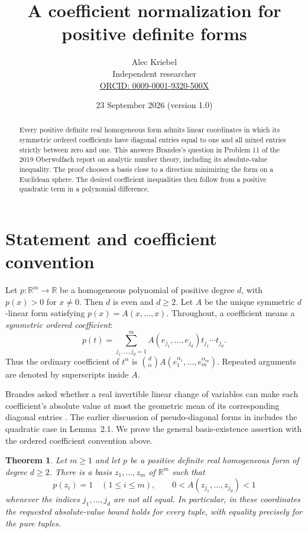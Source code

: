 \documentclass[11pt]{article}
\title{A coefficient normalization for positive definite forms}
\author{Alec Kriebel\\[3pt]\small Independent researcher\\
\small\href{https://orcid.org/0009-0001-9320-500X}{ORCID: 0009-0001-9320-500X}}
\date{23 September 2026 \quad (version 1.0)}
\newtheorem{theorem}{Theorem}
\newcommand{\R}{\mathbb R}
\begin{document}
\maketitle
\begin{abstract}
Every positive definite real homogeneous form admits linear coordinates in
which its symmetric ordered coefficients have diagonal entries equal to one
and all mixed entries strictly between zero and one. This answers Brandes's
question in Problem 11 of the 2019 Oberwolfach report on analytic number
theory, including its absolute-value inequality. The proof chooses a basis
close to a direction minimizing the form on a Euclidean sphere. The desired
coefficient inequalities then follow from a positive quadratic term in a
polynomial difference.
\end{abstract}

\section{Statement and coefficient convention}
Let $p\colon\R^m\to\R$ be a homogeneous polynomial of positive degree $d$, with
$p(x)>0$ for $x\ne0$. Then $d$ is even and $d\ge2$. Let $A$ be the unique
symmetric $d$-linear form satisfying $p(x)=A(x,\ldots,x)$. Throughout, a
coefficient means a \emph{symmetric ordered coefficient}:
\[
 p(t)=\sum_{j_1,\ldots,j_d=1}^m
 A(e_{j_1},\ldots,e_{j_d})t_{j_1}\cdots t_{j_d}.
\]
Thus the ordinary coefficient of $t^\alpha$ is
$\binom{d}{\alpha}A(e_1^{\alpha_1},\ldots,e_m^{\alpha_m})$.
Repeated arguments are denoted by superscripts inside $A$.

Brandes asked whether a real invertible linear change of variables can make
each coefficient's absolute value at most the geometric mean of its
corresponding diagonal entries \cite[p.~3182, Problem~11]{owr}.
The earlier discussion of pseudo-diagonal forms in \cite{brandes} includes
the quadratic case in Lemma~2.1. We prove the general basis-existence assertion
with the ordered coefficient convention above.

\begin{theorem}\label{thm:main}
Let $m\ge1$ and let $p$ be a positive definite real homogeneous form of
degree $d\ge2$. There is a basis $z_1,\ldots,z_m$ of $\R^m$ such that
\[
 p(z_i)=1\quad(1\le i\le m),\qquad
 0<A(z_{j_1},\ldots,z_{j_d})<1
\]
whenever the indices $j_1,\ldots,j_d$ are not all equal. In particular, in
these coordinates the requested absolute-value bound holds for every tuple,
with equality precisely for the pure tuples.
\end{theorem}
\end{document}
